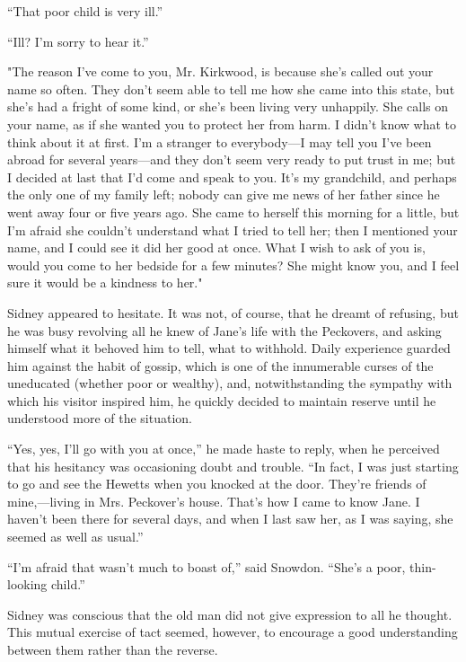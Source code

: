 ``That poor child is very ill.''

``Ill? I'm sorry to hear it.''

"The reason I've come to you, Mr. Kirkwood, is because she's called out
your name so often. They don't seem able to tell me {}how she came into
this state, but she's had a fright of some kind, or she's been living
very unhappily. She calls on your name, as if she wanted you to protect
her from harm. I didn't know what to think about it at first. I'm a
stranger to everybody---I may tell you I've been abroad for several
years---and they don't seem very ready to put trust in me; but I decided
at last that I'd come and speak to you. It's my grandchild, and perhaps
the only one of my family left; nobody can give me news of her father
since he went away four or five years ago. She came to herself this
morning for a little, but I'm afraid she couldn't understand what I
tried to tell her; then I mentioned your name, and I could see it did
her good at once. What I wish to ask of you is, would you come to her
bedside for a few minutes? She might know you, and I feel sure it would
be a kindness to her."

Sidney appeared to hesitate. It was not, of course, that he dreamt of
refusing, but he was busy revolving all he knew of Jane's life with the
Peckovers, and asking himself {}what it behoved him to tell, what to
withhold. Daily experience guarded him against the habit of gossip,
which is one of the innumerable curses of the uneducated (whether poor
or wealthy), and, notwithstanding the sympathy with which his visitor
inspired him, he quickly decided to maintain reserve until he understood
more of the situation.

``Yes, yes, I'll go with you at once,'' he made haste to reply, when he
perceived that his hesitancy was occasioning doubt and trouble. ``In
fact, I was just starting to go and see the Hewetts when you knocked at
the door. They're friends of mine,---living in Mrs. Peckover's house.
That's how I came to know Jane. I haven't been there for several days,
and when I last saw her, as I was saying, she seemed as well as usual.''

``I'm afraid that wasn't much to boast of,'' said Snowdon. ``She's a
poor, thin-looking child.''

Sidney was conscious that the old man did not give expression to all he
thought. This mutual exercise of tact seemed, however, to {}encourage a
good understanding between them rather than the reverse.

